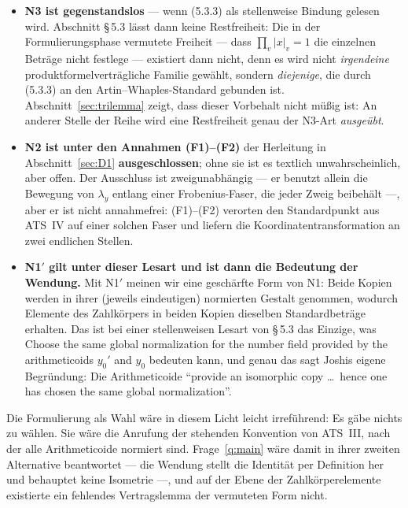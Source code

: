 \documentclass[11pt,a4paper]{article}
\theoremstyle{definition}
\theoremstyle{plain}
\theoremstyle{definition}
\begin{document}
\begin{itemize}
\item \textbf{N3 ist gegenstandslos} --- wenn (5.3.3) als stellenweise Bindung
  gelesen wird. Abschnitt \S\,5.3 lässt dann keine Restfreiheit: Die in der
  Formulierungsphase vermutete Freiheit --- dass $\prod_v |x|_v = 1$ die
  einzelnen Beträge nicht festlege --- existiert dann nicht, denn
  es wird nicht \emph{irgendeine} produktformelverträgliche Familie gewählt, sondern
  \emph{diejenige}, die durch (5.3.3) an den Artin--Whaples-Standard gebunden ist.
  Abschnitt~\ref{sec:trilemma} zeigt, dass dieser Vorbehalt nicht müßig ist: An
  anderer Stelle der Reihe wird eine Restfreiheit genau der N3-Art
  \emph{ausgeübt}.
\item \textbf{N2 ist unter den Annahmen (F1)--(F2)} der Herleitung in
  Abschnitt~\ref{sec:D1} \textbf{ausgeschlossen}; ohne sie ist es textlich
  unwahrscheinlich, aber offen. Der Ausschluss ist zweigunabhängig --- er benutzt
  allein die Bewegung von
  $\lambda_y$ entlang einer Frobenius-Faser, die jeder Zweig beibehält ---, aber
  er ist nicht annahmefrei: (F1)--(F2) verorten den Standardpunkt aus ATS~IV auf
  einer solchen Faser und liefern die Koordinatentransformation an zwei endlichen
  Stellen.
\item \textbf{N1$'$ gilt unter dieser Lesart und ist dann die Bedeutung der
  Wendung.} Mit N1$'$ meinen wir
  eine geschärfte Form von N1: Beide Kopien werden in ihrer (jeweils eindeutigen)
  normierten Gestalt genommen, wodurch Elemente des Zahlkörpers in beiden Kopien
  dieselben Standardbeträge erhalten. Das ist bei einer stellenweisen Lesart von
  \S\,5.3 das Einzige, was
  \glqq Choose the same global normalization for the number field provided by the
  arithmeticoids $y_0'$ and $y_0$\grqq{} bedeuten kann, und genau das sagt Joshis
  eigene Begründung: Die Arithmeticoide ``provide an isomorphic copy \ldots\ hence
  one has chosen the same global normalization''.
\end{itemize}

Die Formulierung als \glqq Wahl\grqq{} wäre in diesem Licht leicht irreführend: Es
gäbe nichts zu wählen. Sie wäre die Anrufung der stehenden Konvention von ATS~III,
nach der alle Arithmeticoide normiert sind. Frage~\ref{q:main} wäre damit in ihrer
zweiten Alternative beantwortet --- die Wendung stellt die Identität per Definition
her und behauptet keine Isometrie ---, und auf der Ebene der Zahlkörperelemente
existierte ein \glqq fehlendes Vertragslemma\grqq{} der vermuteten Form nicht.
\end{document}
